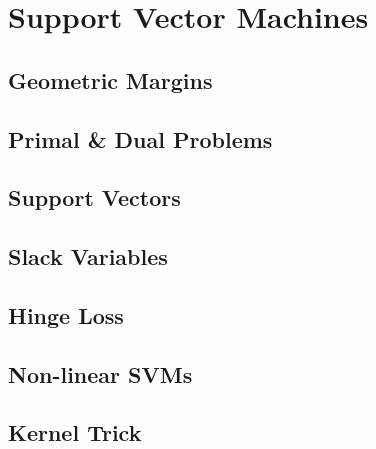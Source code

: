
\chapter{Support Vector Machines}
\label{chapter8}

\section{Geometric Margins}

\section{Primal \& Dual Problems}

\section{Support Vectors}

\section{Slack Variables}

\section{Hinge Loss}

\section{Non-linear SVMs}

\section{Kernel Trick}